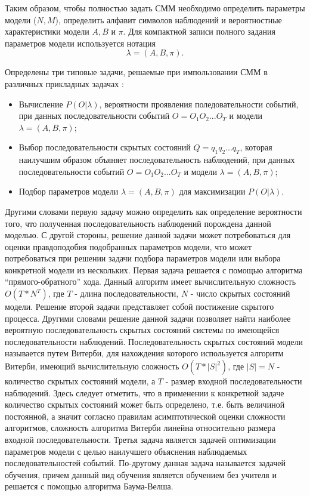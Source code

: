 Таким образом, чтобы полностью задать СММ необходимо определить параметры модели (\(N, M\)), определить алфавит символов наблюдений и вероятностные характеристики модели \(A, B\) и \(\pi\). Для компактной записи полного задания параметров модели используется нотация
\[\lambda = (A, B, \pi).\]

Определены три типовые задачи, решаемые при импользовании СММ в различных прикладных задачах \cite{Rabiner89atutorial}:
\begin{itemize}
	\item
	Вычисление \(P(O|\lambda)\), вероятности проявления поледовательности событий, при данных последовательности событий \(O=O_1O_2...O_T\) и модели \(\lambda = (A, B, \pi)\);
	\item
	Выбор последовательности скрытых состояний \(Q=q_1q_2...q_T\), которая наилучшим образом объяняет последовательность наблюдений, при данных последовательности событий \(O=O_1O_2...O_T\) и модели \(\lambda = (A, B, \pi)\);
	\item
	Подбор параметров модели \(\lambda = (A, B, \pi)\) для максимизации \(P(O|\lambda)\).
\end{itemize} 

Другими словами первую задачу можно определить как определение вероятности того, что полученная последовательность наблюдений порождена данной моделью. С другой стороны, решение данной задачи может потребоваться для оценки правдоподобия подобранных параметров модели, что может потребоваться при решении задачи подбора параметров модели или выбора конкретной модели из нескольких. Первая задача решается с помощью алгоритма ``прямого-обратного'' хода. Данный алгоритм имеет вычислительную сложность \(O(T * N^T)\), где \(T\) - длина последовательности, \(N\) - число скрытых состояний модели. Решение второй задачи представляет собой постижение скрытого процесса. Другими словами решение данной задачи позволяет найти наиболее вероятную последовательность скрытых состояний системы по имеющейся последовательности наблюдений. Последовательность скрытых состояний модели называется путем Витерби, для нахождения которого используется алгоритм Витерби, имеющий вычислительную сложность \(O(T * |S|^2)\), где \(|S| = N\) - количество скрытых состояний модели, а \(T\) - размер входной последовательности наблюдений. Здесь следует отметить, что в применении к конкретной задаче количество скрытых состояний может быть определено, т.е. быть величиной постоянной, а значит согласно правилам асимптотической оценки \cite{clrs} сложности алгоритмов, сложность алгоритма Витерби линейна относительно размера входной последовательности. Третья задача является задачей оптимизации параметров модели с целью наилучшего объяснения наблюдаемых последовательностей событий. По-другому данная задача называется задачей обучения, причем данный вид обучения является обучением без учителя и решается с помощью алгоритма Баума-Велша.

